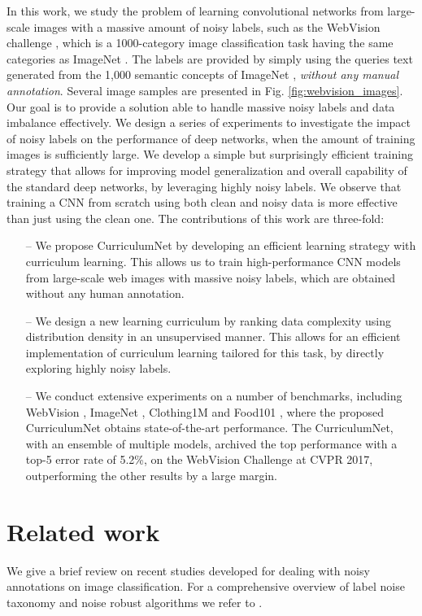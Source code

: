 \documentclass[runningheads]{llncs}
\begin{document}
In this work, we study the problem of learning convolutional networks from large-scale images with a massive amount of noisy labels, such as the WebVision challenge \cite{li2017webvision},  which is a  1000-category image classification task having the same categories as ImageNet \cite{DengDSLL009}. The labels are provided by simply using the queries text generated from the 1,000 semantic concepts of ImageNet \cite{DengDSLL009}, \emph{without any manual annotation}. Several image samples are presented in Fig. \ref{fig:webvision_images}. Our goal is to provide a solution able to handle massive noisy labels and data imbalance effectively. We design a series of experiments to investigate the impact of noisy labels on the performance of deep networks, when the amount of training images is sufficiently large. We develop a simple but surprisingly efficient training strategy that allows for improving model generalization and overall capability of the standard deep networks, by leveraging highly noisy labels. We observe that training a CNN from scratch using both clean and noisy data is more effective than just using the clean one. The contributions of this work are three-fold:
\begin{itemize}
  \item[--] We propose CurriculumNet by developing an efficient learning strategy with curriculum learning. This allows us to train high-performance CNN models from large-scale web images with massive noisy labels, which are obtained without any human annotation.

   \item[--] We design a new learning curriculum by ranking data complexity using distribution density in an unsupervised manner. This allows for an efficient implementation of curriculum learning tailored for this task, by directly exploring highly noisy labels.


   \item[--] We conduct extensive experiments on a number of benchmarks, including WebVision \cite{li2017webvisiondata}, ImageNet \cite{DengDSLL009}, Clothing1M \cite{xiao2015learning} and Food101 \cite{bossard2014food}, where the proposed CurriculumNet obtains state-of-the-art performance. The CurriculumNet, with an ensemble of multiple models, archived the top performance with a top-5 error rate of 5.2\%, on the WebVision Challenge at CVPR 2017, outperforming the other results by a large margin.
\end{itemize}

\section{Related work}
We give a brief review on recent studies developed for dealing with noisy annotations on image classification. For a comprehensive overview of label noise taxonomy and noise
robust algorithms we refer to \cite{frenay2014classification}.
\end{document}

